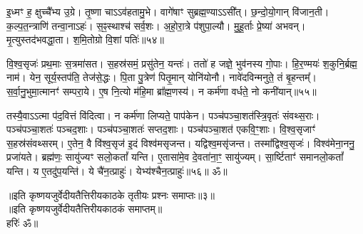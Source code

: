    इ॒ध्मꣳ ह॒ क्षुच्चै᳚भ्य उ॒ग्रे।
   तृ॒ष्णा चाऽऽव॑हतामु॒भे।
   वागे॑षाꣳ सुब्रह्म॒ण्याऽऽसी᳚त्।
   छ॒न्दो॒यो॒गान् वि॑जान॒ती।
   क॒ल्प॒त॒न्त्राणि॑ तन्वा॒नाऽहः॑।
   स॒ꣴ॒स्थाश्च॑ सर्व॒शः।
   अ॒हो॒रा॒त्रे प॑शुपा॒ल्यौ।
   मु॒हू॒र्ताः प्रे॒ष्या॑ अभवन्।
   मृ॒त्युस्तद॑भवद्धा॒ता।
   श॒मि॒तोग्रो वि॒शां पतिः॑॥५४॥

   वि॒श्व॒सृजः॑ प्रथ॒माः स॒त्रमा॑सत।
   स॒हस्र॑समं॒ प्रसु॑तेन॒ यन्तः॑।
   ततो॑ ह जज्ञे॒ भुव॑नस्य गो॒पाः।
   हि॒र॒ण्मयः॑ श॒कुनि॒र्ब्रह्म॒ नाम॑।
   येन॒ सूर्य॒स्तप॑ति॒ तेज॑से॒द्धः।
   पि॒ता पु॒त्रेण॑ पितृ॒मान् योनि॑योनौ।
   नावे॑दविन्मनुते॒ तं बृ॒हन्तम्᳚।
   स॒र्वा॒नु॒भुमा॒त्मानꣳ॑ सम्परा॒ये।
   ए॒ष नि॒त्यो म॑हि॒मा ब्रा᳚ह्म॒णस्य॑।
   न कर्म॑णा वर्धते॒ नो कनी॑यान्॥५५॥

   तस्यै॒वाऽऽत्मा प॑द॒वित्तं वि॑दित्वा।
   न कर्म॑णा लिप्यते॒ पाप॑केन।
   पञ्च॑पञ्चा॒शत॑स्त्रि॒वृतः॑ संवथ्स॒राः।
   पञ्च॑पञ्चा॒शतः॑ पञ्चद॒शाः।
   पञ्च॑पञ्चा॒शतः॑ सप्तद॒शाः।
   पञ्च॑पञ्चा॒शत॑ एकवि॒ꣳ॒शाः।
   वि॒श्व॒सृजाꣳ॑ स॒हस्र॑संवथ्सरम्।
   ए॒तेन॒ वै वि॑श्व॒सृज॑ इ॒दं विश्व॑मसृजन्त।
   यद्विश्व॒मसृ॑जन्त।
   तस्मा᳚द्विश्व॒सृजः॑।
   विश्व॑मेना॒ननु॒ प्रजा॑यते।
   ब्रह्म॑णः॒ सायु॑ज्यꣳ सलो॒कतां᳚ यन्ति।
   ए॒तासा॑मे॒व दे॒वता॑ना॒ꣳ॒ सायु॑ज्यम्।
   सा॒र्ष्टिताꣳ॑ समानलो॒कतां᳚ यन्ति।
   य ए॒तदु॑प॒यन्ति॑।
   ये चै॑न॒त्प्राहुः॑।
   येभ्य॑श्चैन॒त्प्राहुः॑॥५६॥
 ॐ॥
   \anuvakamend

      \begin{center}
॥इति कृष्णयजुर्वेदीयतैत्तिरीयकाठके तृतीयः प्रश्नः समाप्तः॥३॥\\
॥इति कृष्णयजुर्वेदीयतैत्तिरीयकाठकं समाप्तम्॥\\
   हरिः॑  ॐ॥
\end{center}
